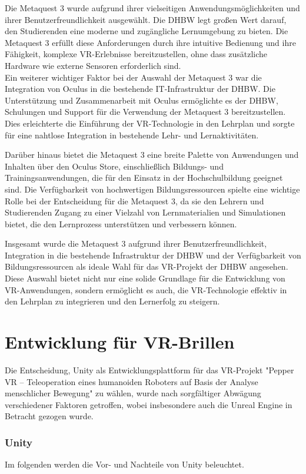 \noindent
Die Metaquest 3 wurde aufgrund ihrer vielseitigen Anwendungsmöglichkeiten und ihrer Benutzerfreundlichkeit ausgewählt. Die DHBW legt großen Wert darauf, den Studierenden eine moderne und zugängliche Lernumgebung zu bieten. Die Metaquest 3 erfüllt diese Anforderungen durch ihre intuitive Bedienung und ihre Fähigkeit, komplexe VR-Erlebnisse bereitzustellen, ohne dass zusätzliche Hardware wie externe Sensoren erforderlich sind.
\\

\noindent
Ein weiterer wichtiger Faktor bei der Auswahl der Metaquest 3 war die Integration von Oculus in die bestehende IT-Infrastruktur der DHBW. Die Unterstützung und Zusammenarbeit mit Oculus ermöglichte es der DHBW, Schulungen und Support für die Verwendung der Metaquest 3 bereitzustellen. Dies erleichterte die Einführung der VR-Technologie in den Lehrplan und sorgte für eine nahtlose Integration in bestehende Lehr- und Lernaktivitäten.

Darüber hinaus bietet die Metaquest 3 eine breite Palette von Anwendungen und Inhalten über den Oculus Store, einschließlich Bildungs- und Trainingsanwendungen, die für den Einsatz in der Hochschulbildung geeignet sind. Die Verfügbarkeit von hochwertigen Bildungsressourcen spielte eine wichtige Rolle bei der Entscheidung für die Metaquest 3, da sie den Lehrern und Studierenden Zugang zu einer Vielzahl von Lernmaterialien und Simulationen bietet, die den Lernprozess unterstützen und verbessern können.

Insgesamt wurde die Metaquest 3 aufgrund ihrer Benutzerfreundlichkeit, Integration in die bestehende Infrastruktur der DHBW und der Verfügbarkeit von Bildungsressourcen als ideale Wahl für das VR-Projekt der DHBW angesehen. Diese Auswahl bietet nicht nur eine solide Grundlage für die Entwicklung von VR-Anwendungen, sondern ermöglicht es auch, die VR-Technologie effektiv in den Lehrplan zu integrieren und den Lernerfolg zu steigern.
\section{Entwicklung für VR-Brillen}
Die Entscheidung, Unity als Entwicklungsplattform für das VR-Projekt "Pepper VR – Teleoperation eines humanoiden Roboters auf Basis der Analyse menschlicher Bewegung" zu wählen, wurde nach sorgfältiger Abwägung verschiedener Faktoren getroffen, wobei insbesondere auch die Unreal Engine in Betracht gezogen wurde.

\subsubsection{Unity}
Im folgenden werden die Vor- und Nachteile von Unity beleuchtet.
